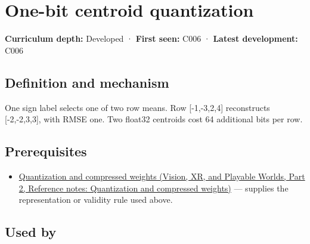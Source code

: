 \hypertarget{appendix-4ccd7a775813}{}\label{referencestart:appendix-4ccd7a775813}
\section{One-bit centroid quantization}\label{appendix-4ccd7a775813-one-bit-centroid-quantization}

\hypertarget{appendix-4ccd7a775813-one-bit-centroid-quantization}{}

\textbf{Curriculum depth:} Developed · \textbf{First seen:} C006 · \textbf{Latest development:} C006

\begin{allmightroledefinition}

\subsection{Definition and mechanism}\label{appendix-4ccd7a775813-definition-and-mechanism}

\hypertarget{appendix-4ccd7a775813-definition-and-mechanism}{}

One sign label selects one of two row means. Row {[}-1,-3,2,4{]} reconstructs {[}-2,-2,3,3{]}, with RMSE one. Two float32 centroids cost 64 additional bits per row.

\end{allmightroledefinition}

\subsection{Prerequisites}\label{appendix-4ccd7a775813-prerequisites}

\hypertarget{appendix-4ccd7a775813-prerequisites}{}

\begin{itemize}
\tightlist
\item
  \href{../07-Vision-XR-and-Playable-Worlds-P02/main.pdf\#appendix-fdc7879e8bf2}{Quantization and compressed weights (Vision, XR, and Playable Worlds, Part 2, Reference notes: Quantization and compressed weights)} --- supplies the representation or validity rule used above.
\end{itemize}

\subsection{Used by}\label{appendix-4ccd7a775813-used-by}

\hypertarget{appendix-4ccd7a775813-used-by}{}

